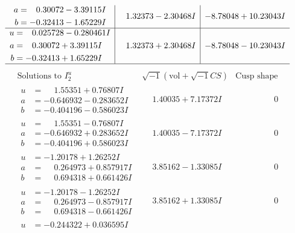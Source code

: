 \documentclass[1p]{elsarticle_modified}
\theoremstyle{definition}
\newcommand{\I}{\sqrt{-1}}
\begin{document}
$$\begin{array}{c|c|c}
\begin{aligned}
a &= \phantom{-}0.30072 - 3.39115 I \\
b &= -0.32413 - 1.65229 I\end{aligned}
 & \phantom{-}1.32373 - 2.30468 I & -8.78048 + 10.23043 I \\ \hline\begin{aligned}
u &= \phantom{-}0.025728 - 0.280461 I \\
a &= \phantom{-}0.30072 + 3.39115 I \\
b &= -0.32413 + 1.65229 I\end{aligned}
 & \phantom{-}1.32373 + 2.30468 I & -8.78048 - 10.23043 I\\
 \hline 
 \end{array}$$\newpage$$\begin{array}{c|c|c}  
\text{Solutions to }I^u_{2}& \I (\text{vol} + \sqrt{-1}CS) & \text{Cusp shape}\\
 \hline 
\begin{aligned}
u &= \phantom{-}1.55351 + 0.76807 I \\
a &= -0.646932 - 0.283652 I \\
b &= -0.404196 - 0.586023 I\end{aligned}
 & \phantom{-}1.40035 + 7.17372 I & \phantom{-0.000000 } 0 \\ \hline\begin{aligned}
u &= \phantom{-}1.55351 - 0.76807 I \\
a &= -0.646932 + 0.283652 I \\
b &= -0.404196 + 0.586023 I\end{aligned}
 & \phantom{-}1.40035 - 7.17372 I & \phantom{-0.000000 } 0 \\ \hline\begin{aligned}
u &= -1.20178 + 1.26252 I \\
a &= \phantom{-}0.264973 + 0.857917 I \\
b &= \phantom{-}0.694318 + 0.661426 I\end{aligned}
 & \phantom{-}3.85162 - 1.33085 I & \phantom{-0.000000 } 0 \\ \hline\begin{aligned}
u &= -1.20178 - 1.26252 I \\
a &= \phantom{-}0.264973 - 0.857917 I \\
b &= \phantom{-}0.694318 - 0.661426 I\end{aligned}
 & \phantom{-}3.85162 + 1.33085 I & \phantom{-0.000000 } 0 \\ \hline\begin{aligned}
u &= -0.244322 + 0.036595 I \\

\end{aligned}
\end{array}$$
\end{document}
